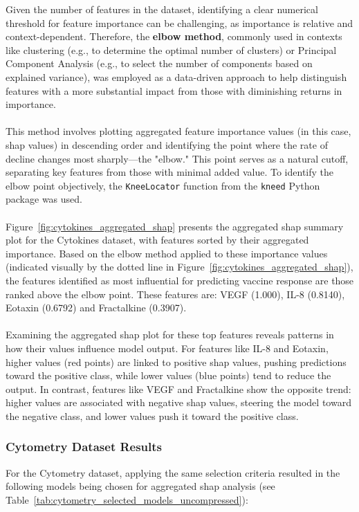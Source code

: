 \documentclass[12pt,a4paper]{report}
\begin{document}
\noindent
Given the number of features in the dataset, identifying a clear numerical threshold for feature importance can be challenging, as importance is relative and context-dependent. Therefore, the \textbf{elbow method}, commonly used in contexts like clustering (e.g., to determine the optimal number of clusters) or Principal Component Analysis (e.g., to select the number of components based on explained variance), was employed as a data-driven approach to help distinguish features with a more substantial impact from those with diminishing returns in importance.\\
\\
This method involves plotting aggregated feature importance values (in this case, \gls{shap} values) in descending order and identifying the point where the rate of decline changes most sharply—the "elbow." This point serves as a natural cutoff, separating key features from those with minimal added value. To identify the elbow point objectively, the \texttt{KneeLocator} function from the \texttt{kneed} Python package was used.\\
\\
Figure~\ref{fig:cytokines_aggregated_shap} presents the aggregated \gls{shap} summary plot for the Cytokines dataset, with features sorted by their aggregated importance. Based on the elbow method applied to these importance values (indicated visually by the dotted line in Figure~\ref{fig:cytokines_aggregated_shap}), the features identified as most influential for predicting vaccine response are those ranked above the elbow point. These features are: VEGF (1.000), IL-8 (0.8140), Eotaxin (0.6792) and Fractalkine (0.3907).\\
\\
Examining the aggregated \gls{shap} plot for these top features reveals patterns in how their values influence model output. For features like IL-8 and Eotaxin, higher values (red points) are linked to positive \gls{shap} values, pushing predictions toward the positive class, while lower values (blue points) tend to reduce the output. In contrast, features like VEGF and Fractalkine show the opposite trend: higher values are associated with negative \gls{shap} values, steering the model toward the negative class, and lower values push it toward the positive class.

\subsubsection*{Cytometry Dataset Results}
For the Cytometry dataset, applying the same selection criteria resulted in the following models being chosen for aggregated \gls{shap} analysis (see Table~\ref{tab:cytometry_selected_models_uncompressed}):\\
\end{document}
